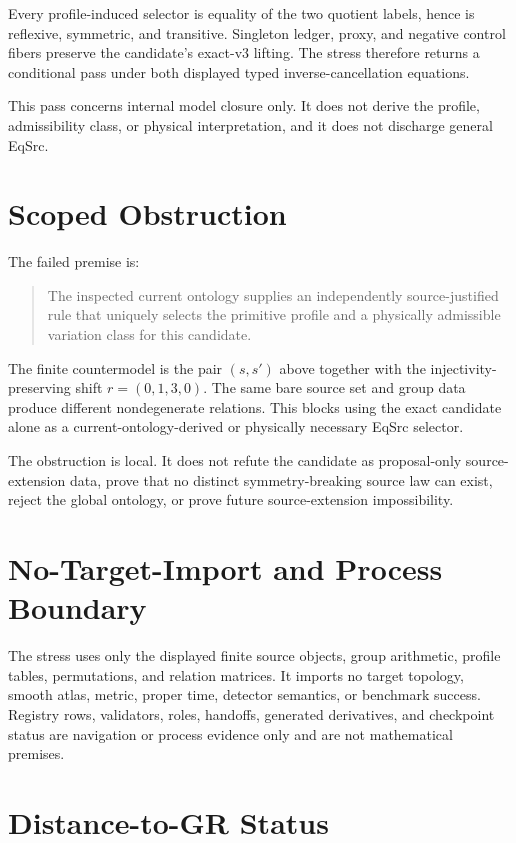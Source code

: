 \documentclass[11pt]{article}
\begin{document}
Every profile-induced selector is equality of the two quotient labels, hence
is reflexive, symmetric, and transitive. Singleton ledger, proxy, and negative
control fibers preserve the candidate's exact-v3 lifting. The stress therefore
returns a conditional pass under both displayed typed inverse-cancellation
equations.

This pass concerns internal model closure only. It does not derive the profile,
admissibility class, or physical interpretation, and it does not discharge
general EqSrc.

\section{Scoped Obstruction}

The failed premise is:

\begin{quote}
The inspected current ontology supplies an independently source-justified rule
that uniquely selects the primitive profile and a physically admissible
variation class for this candidate.
\end{quote}

The finite countermodel is the pair \((s,s')\) above together with the
injectivity-preserving shift \(r=(0,1,3,0)\). The same bare source set and group
data produce different nondegenerate relations. This blocks using the exact
candidate alone as a current-ontology-derived or physically necessary EqSrc
selector.

The obstruction is local. It does not refute the candidate as proposal-only
source-extension data, prove that no distinct symmetry-breaking source law can
exist, reject the global ontology, or prove future source-extension
impossibility.

\section{No-Target-Import and Process Boundary}

The stress uses only the displayed finite source objects, group arithmetic,
profile tables, permutations, and relation matrices. It imports no target
topology, smooth atlas, metric, proper time, detector semantics, or benchmark
success. Registry rows, validators, roles, handoffs, generated derivatives,
and checkpoint status are navigation or process evidence only and are not
mathematical premises.

\section{Distance-to-GR Status}
\end{document}

